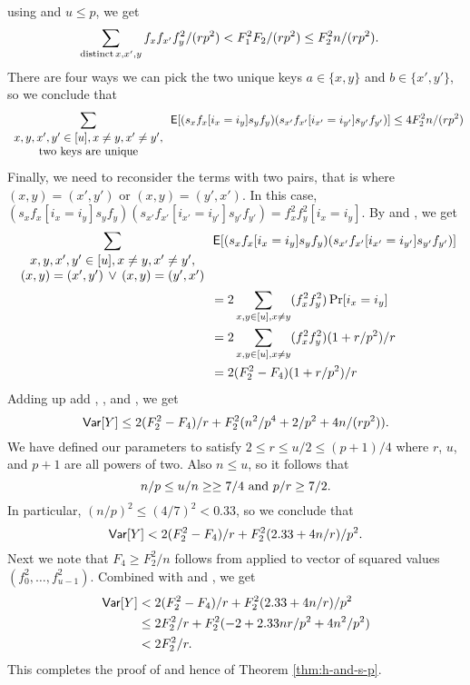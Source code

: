 using  and $u\leq p$, we get 
\begin{align*}
   \sum_{{\rm distinct}\,x,x',y} f_xf_{x'}f_y^2 /(rp^2)&<
   F_1^2F_2/(rp^2)\leq F_2^2 n/(rp^2).
\end{align*}
There are four ways we can pick the two unique keys $a\in \{x,y\}$
and $b\in \{x',y'\}$, so we conclude that
\begin{equation}\label{eq:one-pair}
   \sum_{\begin{array}{c}x,y,x',y'\in[u], x\neq y, x'\neq y',\\
   {\rm two\ keys\ are\ unique}\end{array}}
   \operatorname*{\sf{E}}[(s_x f_x[i_x=i_y]s_y f_y)
   (s_{x'}f_{x'}[i_{x'}=i_{y'}]s_{y'} f_{y'})]\leq 4 F_2^2 n/(rp^2)
\end{equation}
Finally, we need to reconsider the terms with two pairs, that
is where $(x,y)=(x',y')$ or $(x,y)=(y',x')$. In
this case, $(s_x f_x[i_x=i_y]s_y f_y)
(s_{x'}f_{x'}[i_{x'}=i_{y'}]s_{y'} f_{y'})=f_x^2f_y^2[i_x=i_y]$.
By  and ,  we 
get 
\begin{align}
   \sum_{\begin{array}{c}x,y,x',y'\in[u], x\neq y, x'\neq y',\\
   (x,y)=(x',y')\,\vee\,(x,y)=(y',x')\end{array}}
   &
   \operatorname*{\sf{E}}[(s_x f_x[i_x=i_y]s_y f_y)
   (s_{x'}f_{x'}[i_{x'}=i_{y'}]s_{y'} f_{y'})]\nonumber\\
   &=2\sum_{x,y\in[u],x\neq y}(f_x^2f_y^2)\Pr[i_x=i_y]\nonumber\\
   &=2\sum_{x,y\in[u],x\neq y}(f_x^2f_y^2)(1+r/p^2)/r\nonumber\\
   &=2(F_2^2-F_4)(1+r/p^2)/r\label{eq:two-pairs}
      \end{align}
      Adding up add , , and
      , we get 
      \[{\sf Var}[Y]\leq 2(F_2^2-F_4)/r+F_2^2 (n^2/p^4+2/p^2+4 n/(rp^2)).\]
      We have defined our parameters to satisfy $2\leq r\leq u/2\leq (p+1)/4$
      where $r$, $u$, and $p+1$ are all powers of two. Also $n\leq u$, so it 
      follows that
      \begin{equation}
         n/p\leq u/n\geq\geq 7/4\textnormal{ and }p/r\geq 7/2.\label{eq:ratios}
      \end{equation}
      In particular, $(n/p)^2\leq(4/7)^2<0.33$, so we conclude
      that
      \begin{equation}\label{eq:var-good1}
         {\sf Var}[Y]<2(F_2^2-F_4)/r+F_2^2 (2.33+4 n/r)/p^2.
      \end{equation}
      Next we note that $F_4\geq F_2^2/n$ follows from  applied
      to vector of squared values $(f_0^2,\ldots,f_{u-1}^2)$. Combined
      with  and , we get
      \begin{align*}
         {\sf Var}[Y]&<2(F_2^2-F_4)/r+F_2^2 (2.33+4 n/r)/p^2\\
                &\leq 2F_2^2/r+F_2^2(-2+2.33nr/p^2+4 n^2/p^2)\\
                &<2F_2^2/r.
      \end{align*}
      This completes the proof of   and hence
      of Theorem \ref{thm:h-and-s-p}.
